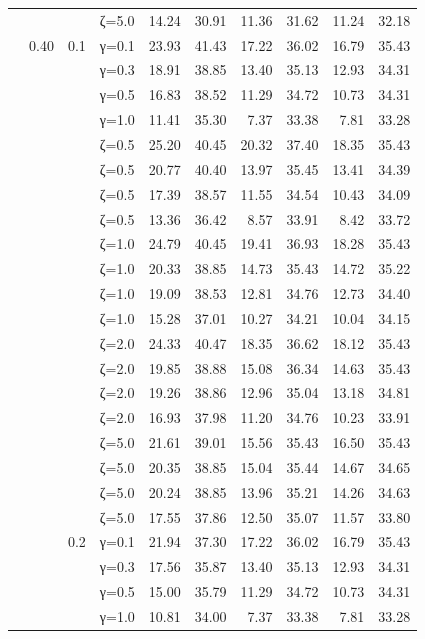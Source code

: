 \begin{table}[htbp]
\begin{tabular}{ll r l  rr  rr  rr}
  &  &  & ζ=5.0 & 14.24 & 30.91 & 11.36 & 31.62 & 11.24 & 32.18 \\
  & 0.40 & 0.1 & γ=0.1 & 23.93 & 41.43 & 17.22 & 36.02 & 16.79 & 35.43 \\
  &  &  & γ=0.3 & 18.91 & 38.85 & 13.40 & 35.13 & 12.93 & 34.31 \\
  &  &  & γ=0.5 & 16.83 & 38.52 & 11.29 & 34.72 & 10.73 & 34.31 \\
  &  &  & γ=1.0 & 11.41 & 35.30 & 7.37 & 33.38 & 7.81 & 33.28 \\
  &  &  & ζ=0.5 & 25.20 & 40.45 & 20.32 & 37.40 & 18.35 & 35.43 \\
  &  &  & ζ=0.5 & 20.77 & 40.40 & 13.97 & 35.45 & 13.41 & 34.39 \\
  &  &  & ζ=0.5 & 17.39 & 38.57 & 11.55 & 34.54 & 10.43 & 34.09 \\
  &  &  & ζ=0.5 & 13.36 & 36.42 & 8.57 & 33.91 & 8.42 & 33.72 \\
  &  &  & ζ=1.0 & 24.79 & 40.45 & 19.41 & 36.93 & 18.28 & 35.43 \\
  &  &  & ζ=1.0 & 20.33 & 38.85 & 14.73 & 35.43 & 14.72 & 35.22 \\
  &  &  & ζ=1.0 & 19.09 & 38.53 & 12.81 & 34.76 & 12.73 & 34.40 \\
  &  &  & ζ=1.0 & 15.28 & 37.01 & 10.27 & 34.21 & 10.04 & 34.15 \\
  &  &  & ζ=2.0 & 24.33 & 40.47 & 18.35 & 36.62 & 18.12 & 35.43 \\
  &  &  & ζ=2.0 & 19.85 & 38.88 & 15.08 & 36.34 & 14.63 & 35.43 \\
  &  &  & ζ=2.0 & 19.26 & 38.86 & 12.96 & 35.04 & 13.18 & 34.81 \\
  &  &  & ζ=2.0 & 16.93 & 37.98 & 11.20 & 34.76 & 10.23 & 33.91 \\
  &  &  & ζ=5.0 & 21.61 & 39.01 & 15.56 & 35.43 & 16.50 & 35.43 \\
  &  &  & ζ=5.0 & 20.35 & 38.85 & 15.04 & 35.44 & 14.67 & 34.65 \\
  &  &  & ζ=5.0 & 20.24 & 38.85 & 13.96 & 35.21 & 14.26 & 34.63 \\
  &  &  & ζ=5.0 & 17.55 & 37.86 & 12.50 & 35.07 & 11.57 & 33.80 \\
  &  & 0.2 & γ=0.1 & 21.94 & 37.30 & 17.22 & 36.02 & 16.79 & 35.43 \\
  &  &  & γ=0.3 & 17.56 & 35.87 & 13.40 & 35.13 & 12.93 & 34.31 \\
  &  &  & γ=0.5 & 15.00 & 35.79 & 11.29 & 34.72 & 10.73 & 34.31 \\
  &  &  & γ=1.0 & 10.81 & 34.00 & 7.37 & 33.38 & 7.81 & 33.28 \\

\end{tabular}
\end{table}
